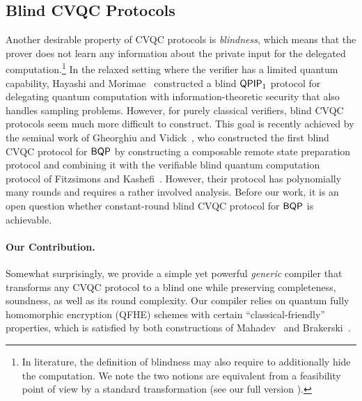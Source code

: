 







\subsection{Blind CVQC Protocols} \label{subsection:blind}



Another desirable property of CVQC protocols is  \emph{blindness}, which means that the prover does not learn any information about the private input for the delegated computation.\footnote{In literature, the definition of blindness may also require to additionally hide the computation. We note the two notions are equivalent from a feasibility point of view by a standard transformation (see our full version \cite{full-version}). 
} In the relaxed setting where the verifier has a limited quantum capability, Hayashi and Morimae~\cite{hayashi2015verifiable} constructed a blind $\operatorname{\mathsf{QPIP}}_1$ protocol for delegating quantum computation with information-theoretic security that also handles sampling problems.
%
However, for purely classical verifiers, blind CVQC protocols seem much more difficult to construct. This goal is recently achieved by the seminal work of Gheorghiu and Vidick~\cite{FOCS:GheVid19}, who constructed the first blind CVQC protocol for $\operatorname{\mathsf{BQP}}$ by constructing a composable remote state preparation protocol and combining it with the verifiable blind quantum computation protocol of Fitzsimons and Kashefi~\cite{FK17}. However, their protocol has   polynomially many rounds  and requires a rather involved analysis. Before our work, it is an open question whether constant-round blind CVQC protocol for $\operatorname{\mathsf{BQP}}$ is achievable.

\paragraph{Our Contribution.} Somewhat surprisingly, we provide a simple yet powerful  
\emph{generic}  compiler that transforms any CVQC protocol to a blind one while preserving completeness, soundness, as well as its round complexity. 
Our compiler relies on quantum fully homomorphic encryption (QFHE) schemes with certain ``classical-friendly'' properties, which is satisfied by both constructions of Mahadev~\cite{mahadev_qfhe} and Brakerski~\cite{brakerski_qfhe}.

